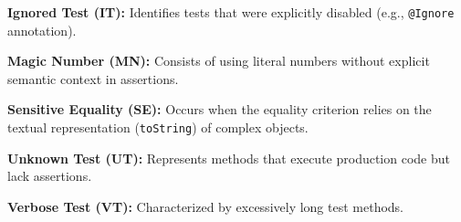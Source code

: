 \documentclass[sigconf]{acmart}
\begin{document}
    \textbf{Ignored Test (IT):}
    Identifies tests that were explicitly disabled (e.g., \texttt{@Ignore} annotation).

    \textbf{Magic Number (MN):}
    Consists of using literal numbers without explicit semantic context in assertions.

    \textbf{Sensitive Equality (SE):}
    Occurs when the equality criterion relies on the textual representation (\texttt{toString}) of complex objects.

    \textbf{Unknown Test (UT):}
    Represents methods that execute production code but lack assertions.

    \textbf{Verbose Test (VT):}
    Characterized by excessively long test methods.
    \vspace{-10px}


\end{document}
